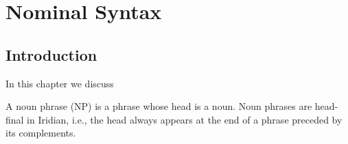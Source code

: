 \chapter{Nominal Syntax}

\section{Introduction}
In this chapter we discuss

A noun phrase (NP) is a phrase whose head is a noun. Noun phrases are head-final in Iridian, i.e., the head always appears at the end of a phrase preceded by its complements.

